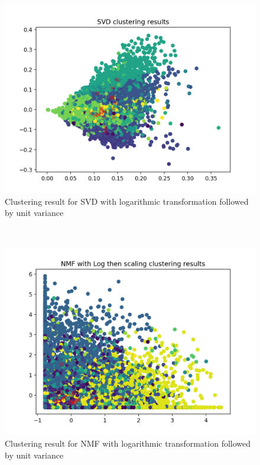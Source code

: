 \documentclass{report}
\begin{document}
\begin{figure}
  \includegraphics[width=\linewidth]{p5_svd_clustering.png} 
  \vspace*{-20mm}
  \caption{Clustering result for SVD with logarithmic transformation followed by unit variance}
  \label{fig:svd3}
\end{figure}

\\

\begin{figure}
  \includegraphics[width=\linewidth]{p5_nmf_clustering.png} 
  \vspace*{-20mm}
  \caption{Clustering result for NMF with logarithmic transformation followed by unit variance}
  \label{fig:nmf6}
\end{figure}
\end{document}
